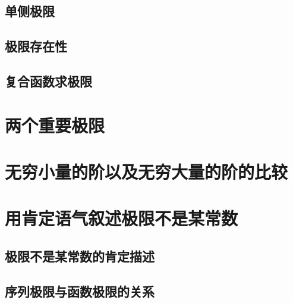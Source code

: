 \subsection{单侧极限}
\subsection{极限存在性}
\subsection{复合函数求极限}
\begin{exercise}
\item
\end{exercise}
\section{两个重要极限}
\begin{exercise}
\item
\end{exercise}
\section{无穷小量的阶以及无穷大量的阶的比较}
\begin{exercise}
\item
\end{exercise}
\section{用肯定语气叙述极限不是某常数}
\subsection{极限不是某常数的肯定描述}
\subsection{序列极限与函数极限的关系}
\begin{exercise}
\item
\end{exercise}
\begin{exercise*}
\item
\end{exercise*}



\endinput
